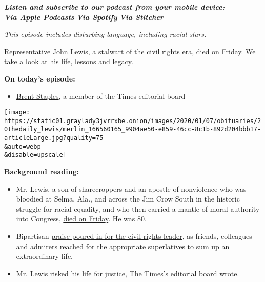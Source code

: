 \emph{\textbf{Listen and subscribe to our podcast from your mobile
device:}}\\
\textbf{\href{https://itunes.apple.com/us/podcast/the-daily/id1200361736?mt=2}{\emph{Via
Apple Podcasts}}} \emph{\textbf{\textbar{}}}
\textbf{\href{https://open.spotify.com/show/3IM0lmZxpFAY7CwMuv9H4g?si=SfuMSC55R1qprFsRZU3_zw}{\emph{Via
Spotify}}} \emph{\textbf{\textbar{}}}
\textbf{\href{http://www.stitcher.com/podcast/the-new-york-times/the-daily-10}{\emph{Via
Stitcher}}}

\emph{This episode includes disturbing language, including racial
slurs.}

Representative John Lewis, a stalwart of the civil rights era, died on
Friday. We take a look at his life, lessons and legacy.

\textbf{On today's episode:}

\begin{itemize}
\tightlist
\item
  \href{https://www.nytimes3xbfgragh.onion/by/brent-staples}{Brent
  Staples}, a member of the Times editorial board
\end{itemize}

\texttt{[image: https://static01.graylady3jvrrxbe.onion/images/2020/01/07/obituaries/20thedaily\_lewis/merlin\_166560165\_9904ae50-e859-46cc-8c1b-892d204bbb17-articleLarge.jpg?quality=75\\\&auto=webp\\\&disable=upscale]}

\textbf{Background reading:}

\begin{itemize}
\item
  Mr. Lewis, a son of sharecroppers and an apostle of nonviolence who
  was bloodied at Selma, Ala., and across the Jim Crow South in the
  historic struggle for racial equality, and who then carried a mantle
  of moral authority into Congress,
  \href{https://www.nytimes3xbfgragh.onion/2020/07/17/us/john-lewis-dead.html}{died
  on Friday}. He was 80.
\item
  Bipartisan
  \href{https://www.nytimes3xbfgragh.onion/2020/07/18/us/politics/john-lewis-dies-reaction.html}{praise
  poured in for the civil rights leader}, as friends, colleagues and
  admirers reached for the appropriate superlatives to sum up an
  extraordinary life.
\item
  Mr. Lewis risked his life for justice,
  \href{https://www.nytimes3xbfgragh.onion/2020/07/17/opinion/john-lewis.html}{The
  Times's editorial board wrote}.
\end{itemize}

